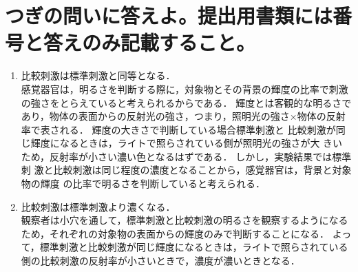 \documentclass[titlepage,a4paper]{jsarticle}
\begin{document}
\section{つぎの問いに答えよ。提出用書類には番号と答えのみ記載すること。}%
\begin{enumerate}
      \item 比較刺激は標準刺激と同等となる． \\
            感覚器官は，明るさを判断する際に，対象物とその背景の輝度の比率で刺激の強さをとらえていると考えられるからである．
            輝度とは客観的な明るさであり，物体の表面からの反射光の強さ，つまり，照明光の強さ×物体の反射率で表される．
            輝度の大きさで判断している場合標準刺激と 比較刺激が同じ輝度になるときは，ライトで照らされている側が照明光の強さが大 きいため，反射率が小さい濃い色となるはずである．
            しかし，実験結果では標準刺 激と比較刺激は同じ程度の濃度となることから，感覚器官は，背景と対象物の輝度 の比率で明るさを判断していると考えられる．
      \item 比較刺激は標準刺激より濃くなる． \\
            観察者は小穴を通して，標準刺激と比較刺激の明るさを観察するようになるため，それぞれの対象物の表面からの輝度のみで判断することになる．
            よって，標準刺激と比較刺激が同じ輝度になるときは，ライトで照らされている側の比較刺激の反射率が小さいときで，濃度が濃いときとなる．
\end{enumerate}
\end{document}
